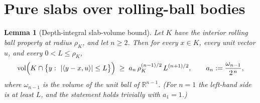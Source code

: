 ﻿\documentclass[11pt]{article}
\newtheorem{lemma}[theorem]{Lemma}
\newcommand{\R}{\mathbb{R}}
\newcommand{\vol}{\operatorname{vol}}
\begin{document}
\section{Pure slabs over rolling-ball bodies}\label{sec:rolling}

\begin{lemma}[Depth-integral slab-volume bound]\label{lem:rolling}
Let $K$ have the interior rolling ball property at radius $\rho_K$, and let
$n\ge2$.  Then for every $x\in K$, every unit vector $u$, and every
$0<L\le\rho_K$,
\[
\vol\Bigl(K\cap\bigl\{y:\ |\langle y-x,u\rangle|\le L\bigr\}\Bigr)
\;\ge\;
a_n\,\rho_K^{(n-1)/2}\,L^{(n+1)/2},
\qquad
a_n:=\frac{\omega_{n-1}}{2^{\,n}},
\]
where $\omega_{n-1}$ is the volume of the unit ball of $\R^{n-1}$.  (For $n=1$
the left-hand side is at least $L$, and the statement holds trivially with
$a_1=1$.)
\end{lemma}
\end{document}
